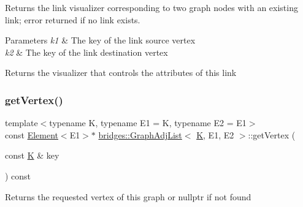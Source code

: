 Returns the link visualizer corresponding to two graph nodes with an existing link; error returned if no link exists.


\begin{DoxyParams}{Parameters}
{\em k1} & The key of the link source vertex \\
\hline
{\em k2} & The key of the link destination vertex\\
\hline
\end{DoxyParams}
\begin{DoxyReturn}{Returns}
the visualizer that controls the attributes of this link 
\end{DoxyReturn}
\mbox{\label{classbridges_1_1_graph_adj_list_a9a222bfc1d37f459caac60508b816fb6}} 
\subsubsection{\texorpdfstring{getVertex()}{getVertex()}\hspace{0.1cm}{\footnotesize\ttfamily [1/2]}}
{\footnotesize\ttfamily template$<$typename K, typename E1 = K, typename E2 = E1$>$ \\
const \mbox{\hyperlink{classbridges_1_1_element}{Element}}$<$E1$>$$\ast$ \mbox{\hyperlink{classbridges_1_1_graph_adj_list}{bridges\+::\+Graph\+Adj\+List}}$<$ \mbox{\hyperlink{namespacebridges_acfb0a4f7877d8f63de3e6862004c50edaa5f3c6a11b03839d46af9fb43c97c188}{K}}, E1, E2 $>$\+::get\+Vertex (\begin{DoxyParamCaption}\item[{const \mbox{\hyperlink{namespacebridges_acfb0a4f7877d8f63de3e6862004c50edaa5f3c6a11b03839d46af9fb43c97c188}{K}} \&}]{key }\end{DoxyParamCaption}) const\hspace{0.3cm}{\ttfamily [inline]}}

\begin{DoxyReturn}{Returns}
the requested vertex of this graph or nullptr if not found 
\end{DoxyReturn}
\mbox{\label{classbridges_1_1_graph_adj_list_a8ba3aefe8e118ce8d8d6fab807e494c1}} 

